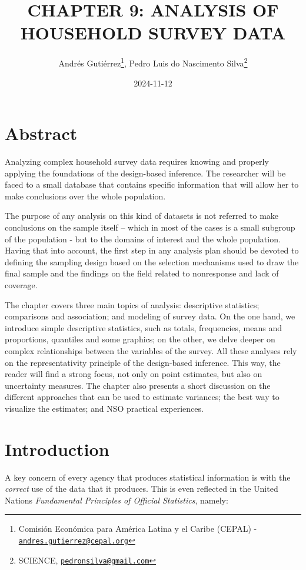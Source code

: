 \documentclass[
  12pt,
]{book}
\title{CHAPTER 9: ANALYSIS OF HOUSEHOLD SURVEY DATA}
\author{Andrés Gutiérrez\footnote{Comisión Económica para América Latina y el Caribe (CEPAL) - \href{mailto:andres.gutierrez@cepal.org}{\nolinkurl{andres.gutierrez@cepal.org}}}, Pedro Luis do Nascimento Silva\footnote{SCIENCE, \href{mailto:pedronsilva@gmail.com}{\nolinkurl{pedronsilva@gmail.com}}}}
\date{2024-11-12}
\begin{document}
\maketitle

{
\hypersetup{linkcolor=}
\setcounter{tocdepth}{0}
\tableofcontents
}
\listoffigures
\listoftables
\hypertarget{abstract}{%
\chapter*{Abstract}\label{abstract}}

Analyzing complex household survey data requires knowing and properly applying the foundations of the design-based inference. The researcher will be faced to a small database that contains specific information that will allow her to make conclusions over the whole population.

The purpose of any analysis on this kind of datasets is not referred to make conclusions on the sample itself -- which in most of the cases is a small subgroup of the population - but to the domains of interest and the whole population. Having that into account, the first step in any analysis plan should be devoted to defining the sampling design based on the selection mechanisms used to draw the final sample and the findings on the field related to nonresponse and lack of coverage.

The chapter covers three main topics of analysis: descriptive statistics; comparisons and association; and modeling of survey data. On the one hand, we introduce simple descriptive statistics, such as totals, frequencies, means and proportions, quantiles and some graphics; on the other, we delve deeper on complex relationships between the variables of the survey. All these analyses rely on the representativity principle of the design-based inference. This way, the reader will find a strong focus, not only on point estimates, but also on uncertainty measures. The chapter also presents a short discussion on the different approaches that can be used to estimate variances; the best way to visualize the estimates; and NSO practical experiences.

\hypertarget{introduction}{%
\chapter*{Introduction}\label{introduction}}

A key concern of every agency that produces statistical information is with the \emph{correct} use of the data that it produces. This is even reflected in the United Nations \emph{Fundamental Principles of Official Statistics}, namely:
\end{document}
